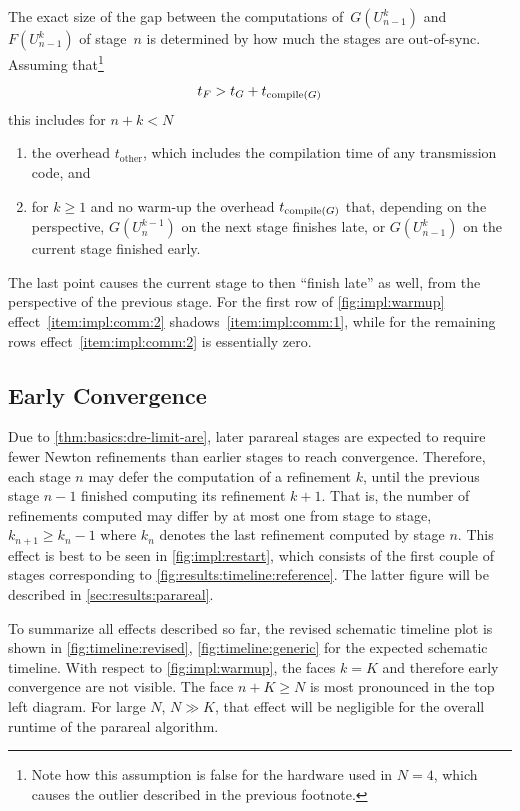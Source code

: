 The exact size of the gap between the computations of~$G(U_{n-1}^k)$ and~$F(U_{n-1}^k)$ of stage~$n$ is determined by
how much the stages are out-of-sync.
Assuming that\footnote{%
  Note how this assumption is false for the hardware used in $N=4$,
  which causes the outlier described in the previous footnote.
}
\begin{equation}
  t_F > t_G + t_{\operatorname{compile}(G)}
\end{equation}
this includes for $n+k < N$
\begin{enumerate}
  \item\label{item:impl:comm:1}
    the overhead $t_\text{other}$,
    which includes \eg the compilation time of any transmission code,
    and
  \item\label{item:impl:comm:2}
    for $k\geq 1$ and no warm-up
    the overhead $t_{\operatorname{compile}(G)}$ that,
    depending on the perspective,
    $G(U_n^{k-1})$ on the next stage finishes late,
    or $G(U_{n-1}^k)$ on the current stage finished early.
\end{enumerate}
The last point causes the current stage to then \enquote{finish late} as well,
from the perspective of the previous stage.
For the first row of \autoref{fig:impl:warmup} effect~\ref{item:impl:comm:2} shadows~\ref{item:impl:comm:1},
while for the remaining rows effect~\ref{item:impl:comm:2} is essentially zero.

\subsection{Early Convergence}
\label{sec:impl:pr:conv}

Due to \autoref{thm:basics:dre-limit-are},
later parareal stages are expected to require fewer Newton refinements than earlier stages to reach convergence.
Therefore, each stage $n$ may defer the computation of a refinement $k$,
until the previous stage $n-1$ finished computing its refinement $k+1$.
That is, the number of refinements computed may differ by at most one from stage to stage,
\ie $k_{n+1} \geq k_n -1$ where $k_n$ denotes the last refinement computed by stage $n$.
This effect is best to be seen in \autoref{fig:impl:restart},
which consists of the first couple of stages corresponding to \autoref{fig:results:timeline:reference}.
The latter figure will be described in \autoref{sec:results:parareal}.

To summarize all effects described so far,
the revised schematic timeline plot is shown in \autoref{fig:timeline:revised},
\cf \autoref{fig:timeline:generic} for the expected schematic timeline.
With respect to \autoref{fig:impl:warmup},
the faces $k=K$ and therefore early convergence are not visible.
The face $n+K \geq N$ is most pronounced in the top left diagram.
For large $N$, $N \gg K$, that effect will be negligible for the overall runtime of the parareal algorithm.

